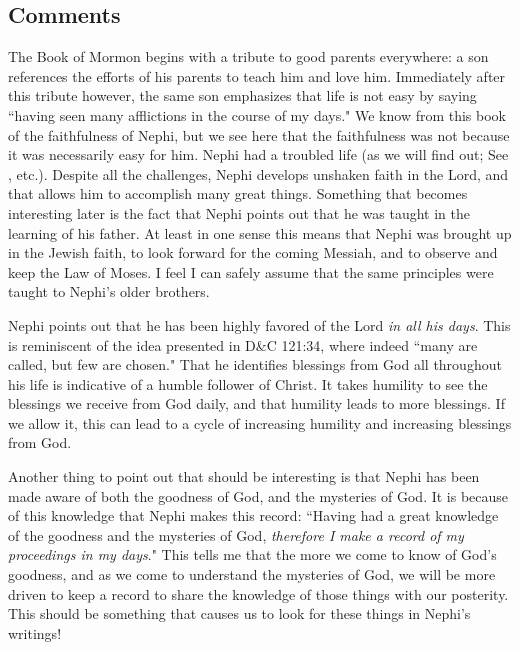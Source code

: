 \documentclass[12pt]{report}
\begin{document}
\subsection{Comments\label{1Nephi1:1:comments}}
The Book of Mormon begins with a tribute to good parents everywhere: a son references the efforts of his parents to teach him and love him.  Immediately after this tribute however, the same son emphasizes that life is not easy by saying ``having seen many afflictions in the course of my days."  We know from this book of the faithfulness of Nephi, but we see here that the faithfulness was not because it was necessarily easy for him.  Nephi had a troubled life (as we will find out; See , etc.).  Despite all the challenges, Nephi develops unshaken faith in the Lord, and that allows him to accomplish many great things.  Something that becomes interesting later is the fact that Nephi points out that he was taught in the learning of his father.  At least in one sense this means that Nephi was brought up in the Jewish faith, to look forward for the coming Messiah, and to observe and keep the Law of Moses.  I feel I can safely assume that the same principles were taught to Nephi's older brothers.

Nephi points out that he has been highly favored of the Lord \emph{in all his days}.  This is reminiscent of the idea presented in D\&C 121:34, where indeed ``many are called, but few are chosen."  That he identifies blessings from God all throughout his life is indicative of a humble follower of Christ.  It takes humility to see the blessings we receive from God daily, and that humility leads to more blessings.  If we allow it, this can lead to a cycle of increasing humility and increasing blessings from God.

Another thing to point out that should be interesting is that Nephi has been made aware of both the goodness of God, and the mysteries of God.  It is because of this knowledge that Nephi makes this record: ``Having had a great knowledge of the goodness and the mysteries of God, \emph{therefore I make a record of my proceedings in my days}."  This tells me that the more we come to know of God's goodness, and as we come to understand the mysteries of God, we will be more driven to keep a record to share the knowledge of those things with our posterity.  This should be something that causes us to look for these things in Nephi's writings!
\end{document}

